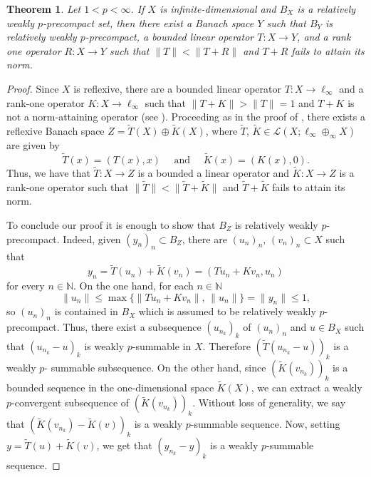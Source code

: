 \documentclass[12 pt]{article}%
\newtheorem{theorem}{Theorem}[section]
\newtheorem{final remark}[theorem]{Final Remark}
\newcommand {\N} {\mathbb{N}}
\newcommand{\norma}[1]{\| #1 \|}
\begin{document}
   
\begin{theorem} \label{teocpp} Let $ 1 < p < \infty$. If $X$ is infinite-dimensional and $B_X$ is a relatively weakly $p$-precompact set, then there exist a Banach space $Y$ such that $B_{Y}$ is relatively weakly $p$-precompact, a bounded linear operator $T: X \to Y$, and a rank one operator $R: X \to Y$ such that $\norma{T} < \norma{T+R}$ and $T+R$ fails to attain its norm.   
\end{theorem}


\begin{proof} Since $X$ is  reflexive, there are a bounded linear operator $T: X \to \ell_\infty$  and a rank-one operator $K: X \to \ell_{\infty}$ such that $\norma{T+K} > \norma{T} = 1$ and $T+K$ is not a norm-attaining operator (see \cite[Theorem 2.1]{jung}). Proceeding as in the proof of \cite[Theorem 1.1]{jung}, there exists a reflexive Banach space $Z = \widetilde{T}(X) \oplus \widetilde{K}(X)$, where  $\widetilde{T}, \, \widetilde{K} \in \mathcal{L}(X; \ell_{\infty} \oplus_{\infty}X)$ are given by 
$$\widetilde{T}(x)=(T(x),x) \quad \text{ and } \quad \widetilde{K}(x)=(K(x),0). $$
Thus, we have that $\widetilde{T}: X \to Z$ is a bounded a linear operator and $\widetilde{K}: X \to Z$ is a rank-one operator such that $\norma{\widetilde{T}} < \norma{\widetilde{T}+ \widetilde{K}}$ and $\widetilde{T}+ \widetilde{K}$ fails to attain its norm. 

To conclude our proof it is enough to show that $B_Z$ is relatively weakly $p$-precompact. Indeed, 
given $(y_{n})_{n} \subset B_{Z}$, there are $(u_n)_n, \, (v_n)_n \subset X$ such that 
$$y_{n}= \widetilde{T}(u_{n}) + \widetilde{K}(v_{n}) = (Tu_n + Kv_n, u_n)$$ for every $n \in \N$. On the one hand, for each $n \in \N$
$$ \norma{u_n}  \leq \max \{ \norma{Tu_n + Kv_n}, \, \norma{u_n} \} =  \norma{y_n} \leq 1, $$
so $(u_n)_n$ is contained in $B_X$ which is assumed to be relatively weakly $p$-precompact. Thus, there exist a subsequence $(u_{n_k})_k$ of $(u_n)_n$ and $u \in B_X$ such that $(u_{n_k}-u)_k$ is weakly $p$-summable in $X$. Therefore $(\widetilde{T}(u_{n_{k}}-u))_{k} $ is a weakly $p$- summable subsequence. On the other hand, since $(\widetilde{K}(v_{n_k}))_k$ is a bounded sequence in the one-dimensional space $\widetilde{K}(X)$, we can extract a weakly $p$-convergent subsequence of $(\widetilde{K}(v_{n_k}))_k$. Without loss of generality, we say that $(\widetilde{K}(v_{n_k}) - \widetilde{K}(v))_k$ is a weakly $p$-summable sequence.
 Now, setting $y= \widetilde{T}(u) + \widetilde{K}(v)$, we get that $(y_{n_k} - y)_k$ is a weakly $p$-summable sequence.
\end{proof}
\end{document}
